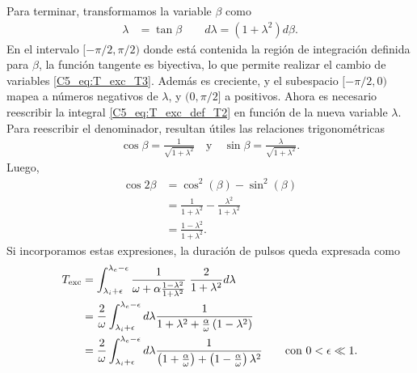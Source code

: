 \documentclass[./main.tex]{subfiles}
\begin{document}
Para terminar, transformamos la variable $\beta$ como
\begin{align}
    \lambda &= \tan{\beta} \qquad
    d\lambda = (1+\lambda^2) d\beta. 
    \label{C5_eq:T_exc_T3}
\end{align}
En el intervalo $[-\pi/2,\pi/2)$ donde está contenida la región de integración definida para $\beta$, la función tangente es biyectiva, lo que permite realizar el cambio de variables \ref{C5_eq:T_exc_T3}. Además es creciente, y el subespacio $[-\pi/2,0)$ mapea a números negativos de $\lambda$, y $(0,\pi/2]$ a positivos. Ahora es necesario reescribir la integral \ref{C5_eq:T_exc_def_T2} en función de la nueva variable $\lambda$. Para reescribir el denominador, resultan útiles las relaciones trigonométricas
\begin{align}
    \cos{\beta} = \frac{1}{\sqrt{1+\lambda^2}} \quad \text{y} \quad \sin{\beta} = \frac{\lambda}{\sqrt{1+\lambda^2}}.
\end{align}
Luego,
\begin{align}
    \cos{2 \beta} &= \cos^2(\beta)-\sin^2(\beta) \nonumber\\
    &=\frac{1}{1+\lambda^2} -  \frac{\lambda^2}{1+\lambda^2} \nonumber\\
    &= \frac{1-\lambda^2}{1+\lambda^2}.
\end{align}
Si incorporamos estas expresiones, la duración de pulsos queda expresada como
\begin{align}
    T_{\text{exc}} &= \int_{\lambda_i+\epsilon}^{\lambda_e -\epsilon} \frac{1}{\omega + \alpha \frac{1-\lambda^2}{1+\lambda^2}} \; \frac{2}{1+\lambda^2} d\lambda \nonumber\\
    &= \frac{2}{\omega}\int_{\lambda_i+\epsilon}^{\lambda_e -\epsilon} d\lambda \frac{1}{1+\lambda^2+\frac{\alpha}{\omega} \left(1-\lambda^2 \right)} \nonumber\\
    &= \frac{2}{\omega}\int_{\lambda_i+\epsilon}^{\lambda_e -\epsilon} d\lambda \frac{1}{\left(1+\frac{\alpha}{\omega} \right) + \left( 1-\frac{\alpha}{\omega}\right) \lambda^2} \qquad \text{con } 0<\epsilon \ll 1. \label{C5_eq:T_exc_def_T3}
\end{align}
\end{document}
